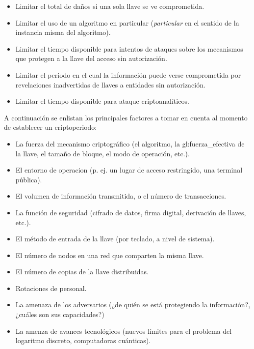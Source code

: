 \begin{itemize}

  \item Limitar el total de daños si una sola llave se ve comprometida.

  \item Limitar el uso de un algoritmo en particular (\textit{particular}
    en el sentido de la instancia misma del algoritmo).

  \item Limitar el tiempo disponible para intentos de ataques sobre los
    mecanismos que protegen a la llave del acceso sin autorización.

  \item Limitar el periodo en el cual la información puede verse comprometida
    por revelaciones inadvertidas de llaves a entidades sin autorización.

  \item Limitar el tiempo disponible para ataque criptoanalíticos.

\end{itemize}

A continuación se enlistan los principales factores a tomar en cuenta al
momento de establecer un criptoperiodo:

\begin{itemize}

  \item La fuerza del mecanismo criptográfico (el algoritmo, la
    \gls{gl:fuerza_efectiva} de la llave, el tamaño de bloque, el modo de
    operación, etc.).


  \item El entorno de operacion (p. ej. un lugar de acceso restringido, una
    terminal pública).

  \item El volumen de información transmitida, o el número de transacciones.

  \item La función de seguridad (cifrado de datos, firma digital, derivación
    de llaves, etc.).

  \item El método de entrada de la llave (por teclado, a nivel de sistema).

  \item El número de nodos en una red que comparten la misma llave.

  \item El número de copias de la llave distribuidas.

  \item Rotaciones de personal.

  \item La amenaza de los adversarios (¿de quién se está protegiendo la
    información?, ¿cuáles son sus capacidades?)

  \item La amenza de avances tecnológicos (nuevos límites para el problema
    del logaritmo discreto, computadoras cuánticas).

\end{itemize}

